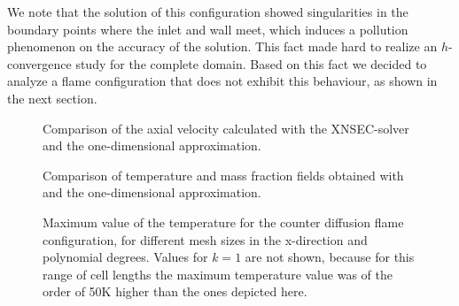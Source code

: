 We note that the solution of this configuration showed singularities in the boundary points where the inlet and wall meet, which induces a pollution phenomenon on the accuracy of the solution. This fact made hard to realize an $h$-convergence study for the complete domain. Based on this fact we decided to analyze a flame configuration that does not exhibit this behaviour, as shown in the next section.
\begin{figure}[t!]
	\centering
	\caption{Comparison of the axial velocity calculated with the XNSEC-solver and the one-dimensional approximation.}
	\label{fig:BoSSS_1D_Comparison_velocity}
\end{figure}
\newpage
\tikzexternaldisable
\begin{figure}[b!]
	\centering
	\caption{Comparison of temperature and mass fraction fields obtained with \BoSSS and the one-dimensional approximation.}
	\label{fig:BoSSS_1D_Comparison}
\end{figure}
\tikzexternalenable



\begin{figure}[tbp]
	\centering
	\caption{Maximum value of the temperature for the counter diffusion flame configuration, for different mesh sizes in the x-direction and polynomial degrees. Values for $k=1$ are not shown, because for this range of cell lengths the maximum temperature value was of the order of 50K higher than the ones depicted here.}
	\label{fig:TemperatureConvergenceDiffFlame}
\end{figure}
\FloatBarrier
\newpage
